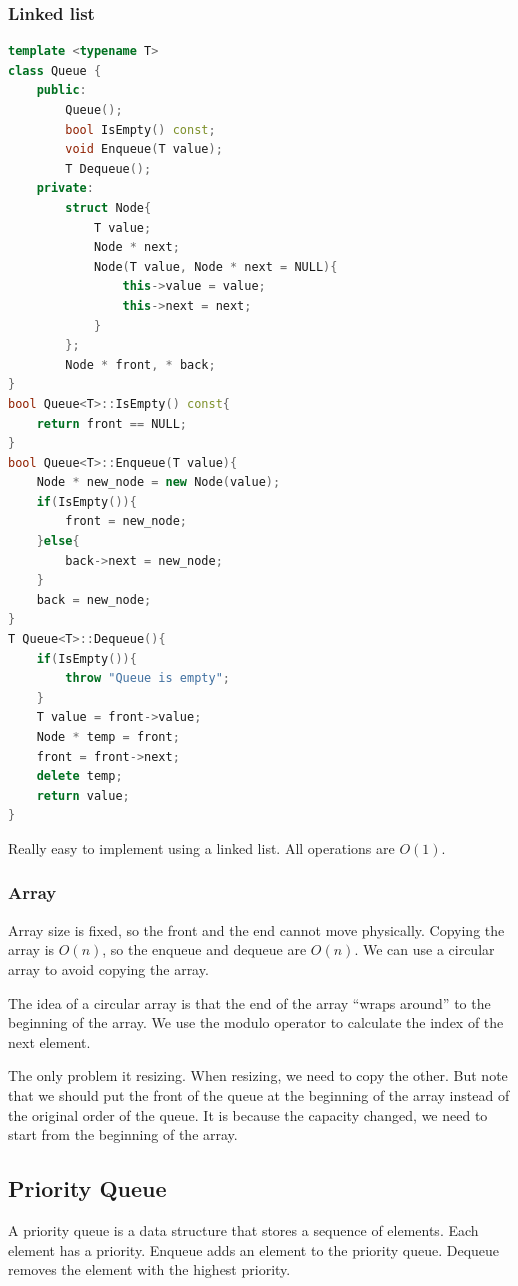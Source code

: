 \documentclass[letterpaper,12pt]{article}
\begin{document}
\subsubsection{Linked list}
\begin{lstlisting}[language=C++]
template <typename T>
class Queue {
    public:
        Queue();
        bool IsEmpty() const;
        void Enqueue(T value); 
        T Dequeue();
    private:
        struct Node{
            T value;
            Node * next;
            Node(T value, Node * next = NULL){
                this->value = value;
                this->next = next;
            }
        };
        Node * front, * back;
}
bool Queue<T>::IsEmpty() const{
    return front == NULL;
}
bool Queue<T>::Enqueue(T value){
    Node * new_node = new Node(value);
    if(IsEmpty()){
        front = new_node;
    }else{
        back->next = new_node;
    }
    back = new_node;
}
T Queue<T>::Dequeue(){
    if(IsEmpty()){
        throw "Queue is empty";
    }
    T value = front->value;
    Node * temp = front;
    front = front->next;
    delete temp;
    return value;
}   
\end{lstlisting}
Really easy to implement using a linked list. All operations are $O(1)$.
\subsubsection{Array}
Array size is fixed, so the front and the end cannot move physically. Copying the array is $O(n)$, so the enqueue and dequeue are $O(n)$. We can use a circular array to avoid copying the array. 

The idea of a circular array is that the end of the array ``wraps around'' to the beginning of the array. We use the modulo operator to calculate the index of the next element.

The only problem it resizing. When resizing, we need to copy the other. But note that we should put the front of the queue at the beginning of the array instead of the original order of the queue. It is because the capacity changed, we need to start from the beginning of the array.

\subsection{Priority Queue}
A priority queue is a data structure that stores a sequence of elements. Each element has a priority. Enqueue adds an element to the priority queue. Dequeue removes the element with the highest priority.
\end{document}
